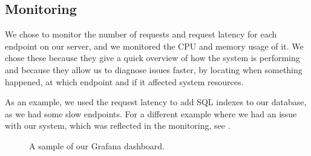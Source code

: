 \subsection{Monitoring}
\label{section:process-monitoring}
We chose to monitor the number of requests and request latency for each endpoint on our server, and we monitored the CPU and memory usage of it. We chose these because they give a quick overview of how the system is performing and because they allow us to diagnose issues faster, by locating when something happened, at which endpoint and if it affected system resources.

As an example, we used the request latency to add SQL indexes to our database, as we had some slow endpoints. For a different example where we had an issue with our system, which was reflected in the monitoring, see .

\begin{figure}[H]
    \caption{A sample of our Grafana dashboard.}
\end{figure}
